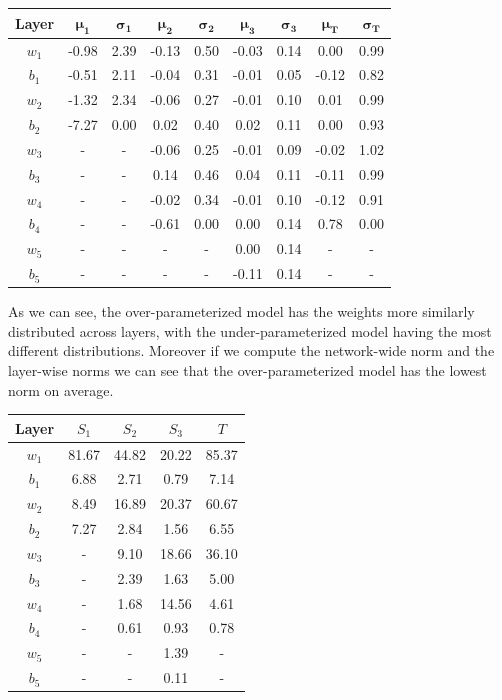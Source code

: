 \begin{table}[H]
    \centering
    \begin{tabular}{c|cc|cc|cc|cc}
    \toprule
    \textbf{Layer} & $\mathbf{\mu_1}$ & $\mathbf{\sigma_1}$ & $\mathbf{\mu_2}$ & $\mathbf{\sigma_2}$ & $\mathbf{\mu_3}$ & $\mathbf{\sigma_3}$ & $\mathbf{\mu_T}$ & $\mathbf{\sigma_T}$ \\
    \midrule
    $w_1$ & -0.98 & 2.39 & -0.13 & 0.50 & -0.03 & 0.14 & 0.00 & 0.99 \\
    $b_1$ & -0.51 & 2.11 & -0.04 & 0.31 & -0.01 & 0.05 & -0.12 & 0.82 \\
    $w_2$ & -1.32 & 2.34 & -0.06 & 0.27 & -0.01 & 0.10 & 0.01 & 0.99 \\
    $b_2$ & -7.27 & 0.00 & 0.02 & 0.40 & 0.02 & 0.11 & 0.00 & 0.93 \\
    $w_3$ & - & - & -0.06 & 0.25 & -0.01 & 0.09 & -0.02 & 1.02 \\
    $b_3$ & - & - & 0.14 & 0.46 & 0.04 & 0.11 & -0.11 & 0.99 \\
    $w_4$ & - & - & -0.02 & 0.34 & -0.01 & 0.10 & -0.12 & 0.91 \\
    $b_4$ & - & - & -0.61 & 0.00 & 0.00 & 0.14 & 0.78 & 0.00 \\
    $w_5$ & - & - & - & - & 0.00 & 0.14 & - & - \\
    $b_5$ & - & - & - & - & -0.11 & 0.14 & - & - \\
    \bottomrule
    \end{tabular}
\end{table}

As we can see, the over-parameterized model has the weights more similarly distributed
across layers, with the under-parameterized model having the most different distributions.
Moreover if we compute the network-wide norm and the layer-wise norms we can see that the
over-parameterized model has the lowest norm on average.

\begin{table}[H]
    \centering
    \begin{tabular}{c|ccc|c}
    \toprule
    \textbf{Layer} & $S_1$ & $S_2$ & $S_3$ & $T$ \\
    \midrule
    $w_1$ & 81.67 & 44.82 & 20.22 & 85.37 \\
    $b_1$ & 6.88  & 2.71  & 0.79  & 7.14  \\
    $w_2$ & 8.49  & 16.89 & 20.37 & 60.67 \\
    $b_2$ & 7.27  & 2.84  & 1.56  & 6.55  \\
    $w_3$ & -     & 9.10  & 18.66 & 36.10 \\
    $b_3$ & -     & 2.39  & 1.63  & 5.00  \\
    $w_4$ & -     & 1.68  & 14.56 & 4.61  \\
    $b_4$ & -     & 0.61  & 0.93  & 0.78  \\
    $w_5$ & -     & -     & 1.39  & -     \\
    $b_5$ & -     & -     & 0.11  & -     \\
    \bottomrule
    \end{tabular}
\end{table}
